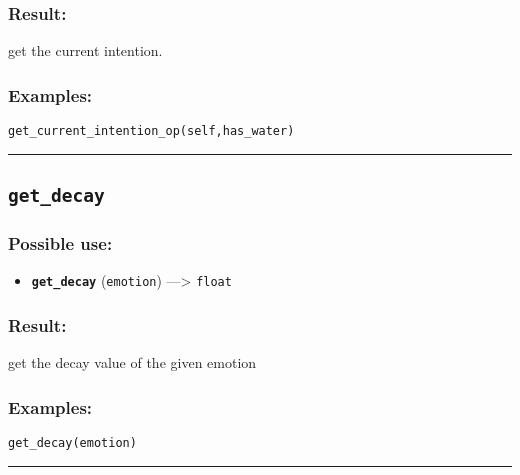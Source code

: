 \documentclass[]{book}
\providecommand{\tightlist}{%
  \setlength{\itemsep}{0pt}\setlength{\parskip}{0pt}}
\theoremstyle{definition}
\theoremstyle{definition}
\theoremstyle{definition}
\theoremstyle{remark}
\begin{document}
\subsubsection{Result:}\label{result-195}

get the current intention.

\subsubsection{Examples:}\label{examples-148}

\begin{verbatim}
get_current_intention_op(self,has_water) 
\end{verbatim}

\begin{center}\rule{0.5\linewidth}{\linethickness}\end{center}

\subsection{\texorpdfstring{\texttt{get\_decay}}{get\_decay}}\label{get_decay}

\subsubsection{Possible use:}\label{possible-use-202}

\begin{itemize}
\tightlist
\item
  \textbf{\texttt{get\_decay}} (\texttt{emotion}) ---\textgreater{}
  \texttt{float}
\end{itemize}

\subsubsection{Result:}\label{result-196}

get the decay value of the given emotion

\subsubsection{Examples:}\label{examples-149}

\begin{verbatim}
get_decay(emotion) 
\end{verbatim}

\begin{center}\rule{0.5\linewidth}{\linethickness}\end{center}
\end{document}
